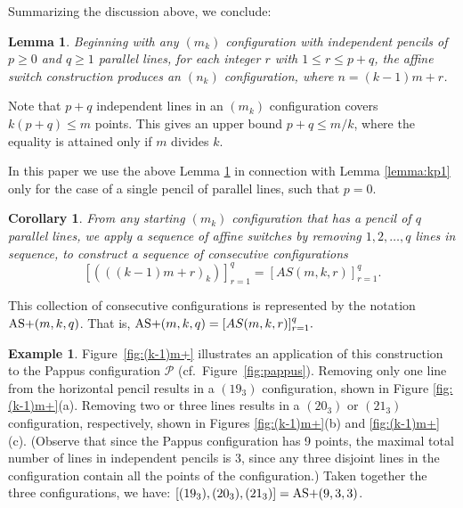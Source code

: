 \documentclass[reqno,12pt]{amsart}
\theoremstyle{plain}
\newtheorem{lemma}[theorem]{Lemma}
\newtheorem{corollary}[theorem]{Corollary}
\theoremstyle{definition}
\newtheorem{example}{Example}
\theoremstyle{remark}
\newcommand{\mc}[1]{\mathcal{#1}}
\begin{document}

Summarizing the discussion above, we conclude:


%
\begin{lemma}\label{lemma:km1pr}
Beginning with any $(m_k)$ configuration with independent pencils of $p\geq 0$ and $q \geq 1$ parallel lines, 
for each integer $r$ with $1 \leq r \leq p+q$, the affine switch construction produces an $(n_k)$ configuration, 
where $n = (k-1)m+r$.
\end{lemma}

Note that $p+q$ independent lines in an $(m_k)$ configuration covers $k(p+q) \leq m$ points. This gives an upper bound 
$p+q \leq m/k$, where the equality is attained only if $m$ divides $k$. 

In this paper we use the above Lemma \ref{lemma:km1pr} in connection with Lemma \ref{lemma:kp1} only for the case 
of a single pencil of parallel lines, such that $p = 0$. 

\begin{corollary}\label{lem:affineSwitch}
From any starting $(m_{k})$ configuration that has a pencil of $q$ parallel lines, we  apply a sequence of affine switches 
by removing $1, 2, \ldots, q$ lines in sequence, to construct a  sequence of  consecutive configurations 
\[  [ (((k-1)m+r)_{k})  ]_{r=1}^{q} = [  AS(m, k, r) ]_{r=1}^{q}. \]
\end{corollary}

This collection of consecutive configurations is represented by the notation $\mathrm{AS+}(m, k, q)$. 
That is, $\mathrm{AS+}(m,k,q) =  [  AS(m, k, r) ]_{r=1}^{q}.$

\begin{example}
Figure~\ref{fig:(k-1)m+} illustrates an application of this construction to the Pappus configuration $\mc{P}$ 
(cf.\ Figure~\ref{fig:pappus}).
Removing only one line from the horizontal pencil results in a $(19_3)$ configuration, shown in Figure \ref{fig:(k-1)m+}(a). 
Removing two or three lines results in a $(20_3)$ or $(21_3)$ configuration, respectively, shown in Figures \ref{fig:(k-1)m+}(b) 
and \ref{fig:(k-1)m+}(c). 
(Observe that since the Pappus configuration has 9 points, the maximal total number of lines in independent pencils is 3, 
since any three disjoint lines in the configuration contain all the points of the configuration.) Taken together the three 
configurations, we have: $[(19_{3}), (20_{3}), (21_{3})] = \mathrm{AS+}(9,3,3)$. 
\end{example}
\end{document}
